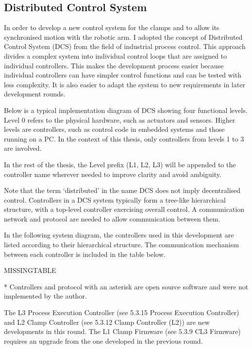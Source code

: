 \subsection{Distributed Control System}
\label{subsection:exploration_2_distributed_control_system}

In order to develop a new control system for the clamps and to allow its synchronised motion with the robotic arm. I adopted the concept of Distributed Control System (DCS) from the field of industrial process control. This approach divides a complex system into individual control loops that are assigned to individual controllers. This makes the development process easier because individual controllers can have simpler control functions and can be tested with less complexity. It is also easier to adapt the system to new requirements in later development rounds. 

Below is a typical implementation diagram of DCS showing four functional levels. Level 0 refers to the physical hardware, such as actuators and sensors. Higher levels are controllers, such as control code in embedded systems and those running on a PC. In the context of this thesis, only controllers from levels 1 to 3 are involved.

In the rest of the thesis, the Level prefix (L1, L2, L3) will be appended to the controller name wherever needed to improve clarity and avoid ambiguity.

Note that the term ‘distributed’ in the name DCS does not imply decentralised control. Controllers in a DCS system typically form a tree-like hierarchical structure, with a top-level controller exercising overall control. A communication network and protocol are needed to allow communication between them. 

In the following system diagram, the controllers used in this development are listed according to their hierarchical structure. The communication mechanism between each controller is included in the table below.

MISSINGTABLE

* Controllers and protocol with an asterisk are open source software and were not implemented by the author.

The L3 Process Execution Controller (see 5.3.15 Process Execution Controller) and L2 Clamp Controller (see 5.3.12 Clamp Controller (L2)) are new developments in this round. The L1 Clamp Firmware (see 5.3.9 CL3 Firmware) requires an upgrade from the one developed in the previous round. 


